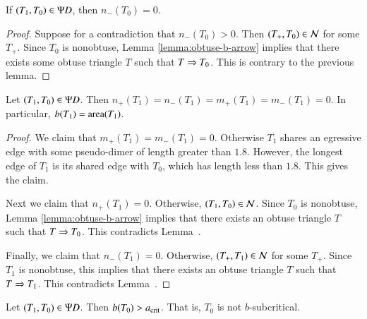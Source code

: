 \begin{corollary}
If $(T_1,T_0)\in\Psi D$, then $n_-(T_0)=0$.
\end{corollary}

\begin{proof} 
  Suppose for a contradiction that $n_-(T_0)>0$.  Then $(T_+,T_0)\in
  \mathcal N$ for some $T_+$.  Since $T_0$ is nonobtuse, Lemma
  \ref{lemma:obtuse-b-arrow} implies that there exists some obtuse
  triangle $T$ such that $T\Rightarrow T_0$.  This is contrary to the previous
  lemma.
\end{proof}

\begin{lemma} 
  Let $(T_1,T_0)\in\Psi D$.  Then
  $n_+(T_1)=n_-(T_1)=m_+(T_1)=m_-(T_1)=0$.  In particular, $b(T_1) =
  {\operatorname{area}}(T_1)$.
\end{lemma}

\begin{proof}  
  We claim that $m_+(T_1)=m_-(T_1)=0$.  Otherwise $T_1$ shares an
  egressive edge with some pseudo-dimer of length greater than $1.8$.
  However, the longest edge of $T_1$ is its shared edge with $T_0$,
  which has length less than $1.8$.  This gives the claim.

  Next we claim that $n_+(T_1)=0$.  Otherwise, $(T_1,T_0)\in \mathcal N$.
  Since $T_0$ is nonobtuse, Lemma \ref{lemma:obtuse-b-arrow} 
  implies that there exists an obtuse
  triangle $T$ such that $T\Rightarrow T_0$.  This contradicts
  Lemma~.

  Finally, we claim that $n_-(T_1)=0$.  Otherwise, $(T_+,T_1)\in \mathcal N$ for
  some $T_+$.  Since $T_1$ is nonobtuse, this implies that there exists
  an obtuse triangle $T$ such that $T\Rightarrow T_1$.  This contradicts
  Lemma~.
\end{proof}

\begin{lemma}  
  Let $(T_1,T_0)\in\Psi D$.  Then $b(T_0) > a_\text{crit}$.  That is, $T_0$ is
  not $b$-subcritical.
\end{lemma}

